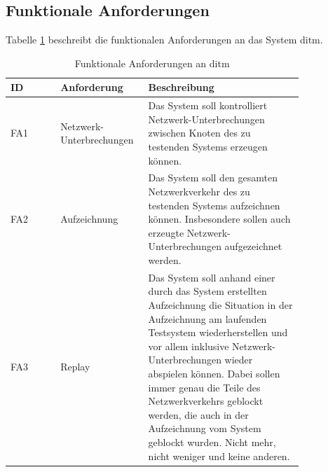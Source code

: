 \documentclass[12pt,a4paper]{report}
\begin{document}
\subsection{Funktionale Anforderungen}
Tabelle \ref{tab:fa} beschreibt die funktionalen Anforderungen an das System ditm.
\begin{longtable}[H]{|p{}|p{0.3\linewidth}|p{0.53\linewidth}|}
	\caption{Funktionale Anforderungen an ditm\label{tab:fa}}                                                                                                                                                                                                                                                                                                                                                                                        \\
	\hline
	ID   & Anforderung                   & Beschreibung                                                                                                                                                                                                                                                                                                                                                                                              \\ \hline
	FA1  & Netzwerk-Unterbrechungen      & Das System soll kontrolliert Netzwerk-Unterbrechungen zwischen Knoten des zu testenden Systems erzeugen können.                                                                                                                                                                                                                                                                                           \\ \hline
	FA2  & Aufzeichnung                  & Das System soll den gesamten Netzwerkverkehr des zu testenden Systems aufzeichnen können. Insbesondere sollen auch erzeugte Netzwerk-Unterbrechungen aufgezeichnet werden.                                                                                                                                                                                                                                \\ \hline
	FA3  & Replay                        & Das System soll anhand einer durch das System erstellten Aufzeichnung die Situation in der Aufzeichnung am laufenden Testsystem wiederherstellen und vor allem inklusive Netzwerk-Unterbrechungen wieder abspielen können. Dabei sollen immer genau die Teile des Netzwerkverkehrs geblockt werden, die auch in der Aufzeichnung vom System geblockt wurden. Nicht mehr, nicht weniger und keine anderen. \\ \hline

\end{longtable}
\end{document}
